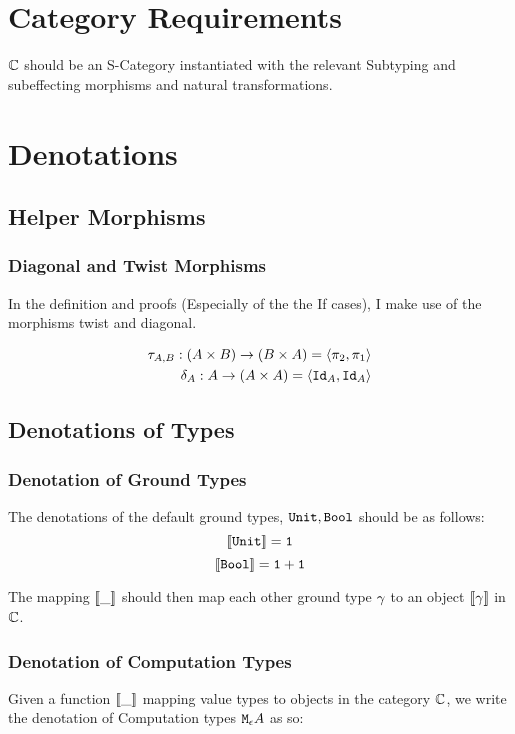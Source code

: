 \documentclass{report}
\begin{document}
\chapter{Category Requirements}
$\mathbb{C}$ should be an S-Category instantiated with the relevant Subtyping and subeffecting morphisms and natural transformations.

\chapter{Denotations}
\section{Helper Morphisms}
\subsection{Diagonal and Twist Morphisms}

In the definition and proofs (Especially of the the If cases), I make use of the morphisms twist and diagonal.

\begin{align*}
    \tau_{A, B}: (A\times B) \rightarrow (B\times A) = \langle\pi_2, \pi_1\rangle\\
    \delta_{A}: A \rightarrow (A\times A)  = \langle\texttt{Id}_{A}, \texttt{Id}_{A}\rangle
\end{align*}
\section{Denotations of Types}
\subsection{Denotation of Ground Types}
The denotations of the default ground types, $\texttt{Unit}, \texttt{Bool}$ should be as follows:
\begin{equation}
    {\bf [\![}\texttt{Unit}{\bf ]\!]} = \texttt{1}
\end{equation}
\begin{equation}
    {\bf [\![}\texttt{Bool}{\bf ]\!]} = \texttt{1} + \texttt{1}
\end{equation}

The mapping ${\bf [\![}\_{\bf ]\!]}$ should then map each other ground type $\gamma$ to an object ${\bf [\![}\gamma{\bf ]\!]}$ in $\mathbb{C}$.

\subsection{Denotation of Computation Types}
Given a function ${\bf [\![}\_{\bf ]\!]}$ mapping value types to objects in the category $\mathbb{C}$, we write the denotation of Computation types $\texttt{M}_{\epsilon}{A}$ as so:
\end{document}
